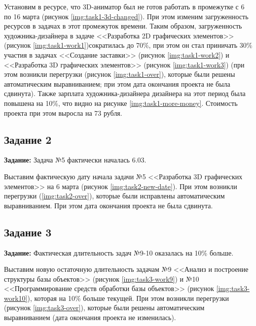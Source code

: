 Установим в ресурсе, что 3D-аниматор был не готов работать в промежутке с 6 по 16 марта (рисунок \ref{img:task1-3d-changed}). При этом изменим загруженность ресурсов в задачах в этот промежуток времени. Таким образом, загруженность художника-дизайнера в задаче <<Разработка 2D графических элементов>> (рисунок \ref{img:task1-work1})сократилась до 70\%, при этом он стал приничать 30\% участия в задачах <<Создание заставки>> (рисунок \ref{img:task1-work2}) и <<Разработка 3D графических элементов>> (рисунок \ref{img:task1-work3}) (при этом возникли перегрузки (рисунок \ref{img:task1-over}), которые были решены автоматическим выравниванием; при этом дата окончания проекта не была сдвинута). Также зарплата художника-дизайнера дизайнера на этот период была повышена на 10\%, что видно на рисунке \ref{img:task1-more-money}. Стоимость проекта при этом выросла на 73 рубля.



\clearpage
\subsection{Задание 2}

\textbf{Задание:} Задача №5 фактически началась 6.03.

Выставим фактическую дату начала задачи №5 <<Разработка 3D графических элементов>> на 6 марта (рисунок \ref{img:task2-new-date}). При этом возникли перегрузки (\ref{img:task2-over}), которые были исправлены автоматическим выравниванием. При этом дата окончания проекта не была сдвинута.



\clearpage
\subsection{Задание 3}

\textbf{Задание:} Фактическая длительность задач №9-10 оказалась на 10\% больше.

Выставим новую остаточную длительность задачам №9 <<Анализ и построение структуры базы объектов>> (рисунок \ref{img:task3-work9}) и №10 <<Программирование средств обработки базы объектов>> (рисунок \ref{img:task3-work10}), которая на 10\% больше текущей. При этом возникли перегрузки (рисунок \ref{img:task3-over}), которые были решены автоматическим выравниванием (дата окончания проекта не изменилась).

